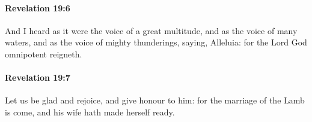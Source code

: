 		\paragraph{Revelation 19:6} %
			\label{REVELATIONNT-19-6}

			And I heard as it were the voice of a great multitude, and as the voice of many waters, and as the voice of mighty thunderings, saying, Alleluia: for the Lord God omnipotent reigneth.

			\begin{framed}
			\scriptsize
				\begin{compactdesc}
					\item[SBLG] 
				\end{compactdesc}
			\end{framed}

		\paragraph{Revelation 19:7} %
			\label{REVELATIONNT-19-7}

			Let us be glad and rejoice, and give honour to him: for the marriage of the Lamb is come, and his wife hath made herself ready.

